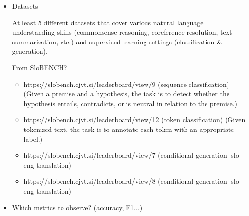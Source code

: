 \documentclass[fleqn,moreauthors,10pt]{ds_report}
\begin{document}
\begin{itemize}
    \item Datasets
    
    At least 5 different datasets that cover various natural language understanding skills (commonsense reasoning, coreference resolution, text summarization, etc.) and supervised learning settings (classification \& generation).
    
    From SloBENCH?
    \begin{itemize}
        \item https://slobench.cjvt.si/leaderboard/view/9 (sequence classification) (Given a premise and a hypothesis, the task is to detect whether the hypothesis entails, contradicts, or is neutral in relation to the premise.)
        \item https://slobench.cjvt.si/leaderboard/view/12 (token classification) (Given tokenized text, the task is to annotate each token with an appropriate label.)
        \item https://slobench.cjvt.si/leaderboard/view/7 (conditional generation, slo-eng translation)
        \item https://slobench.cjvt.si/leaderboard/view/8 (conditional generation, slo-eng translation)
    \end{itemize}
    
    \item Which metrics to observe? (accuracy, F1...)
    
\end{itemize}





\end{document}
